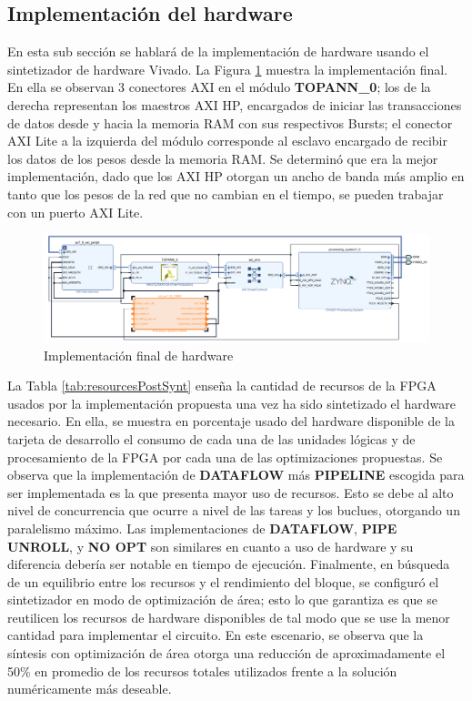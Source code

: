 \subsection{Implementación del hardware}

En esta sub sección se hablará de la implementación de hardware usando el sintetizador de hardware Vivado. La Figura \ref{fig:hwImp} muestra la implementación final. En ella se observan 3 conectores AXI en el módulo \textbf{TOPANN\_0}; los de la derecha representan los maestros AXI HP, encargados de iniciar las transacciones de datos desde y hacia la memoria RAM con sus respectivos Bursts; el conector AXI Lite a la izquierda del módulo corresponde al esclavo encargado de recibir los datos de los pesos desde la memoria RAM. Se determinó que era la mejor implementación, dado que los AXI HP otorgan un ancho de banda más amplio en tanto que los pesos de la red que no cambian en el tiempo, se pueden trabajar con un puerto AXI Lite.

\begin{figure}[!ht]
	\centering
		\includegraphics[scale=0.95]{Figures/hwImp}
	\caption{Implementación final de hardware}
	\label{fig:hwImp}
\end{figure} 

La Tabla \ref{tab:resourcesPostSynt} enseña la cantidad de recursos de la FPGA usados por la implementación propuesta una vez ha sido sintetizado el hardware necesario. En ella, se muestra en porcentaje usado del hardware disponible de la tarjeta de desarrollo el consumo de cada una de las unidades lógicas y de procesamiento de la FPGA por cada una de las optimizaciones propuestas. Se observa que la implementación de \textbf{DATAFLOW} más \textbf{PIPELINE} escogida para ser implementada es la que presenta mayor uso de recursos. Esto se debe al alto nivel de concurrencia que ocurre a nivel de las tareas y los buclues, otorgando un paralelismo máximo. Las implementaciones de \textbf{DATAFLOW}, \textbf{PIPE UNROLL}, y \textbf{NO OPT} son similares en cuanto a uso de hardware y su diferencia debería ser notable en tiempo de ejecución. Finalmente, en búsqueda de un equilibrio entre los recursos y el rendimiento del bloque, se configuró el sintetizador en modo de optimización de área; esto lo que garantiza es que se reutilicen los recursos de hardware disponibles de tal modo que se use la menor cantidad para implementar el circuito. En este escenario, se observa que la síntesis con optimización de área otorga una reducción de aproximadamente el 50\% en promedio de los recursos totales utilizados frente a la solución numéricamente más deseable.

